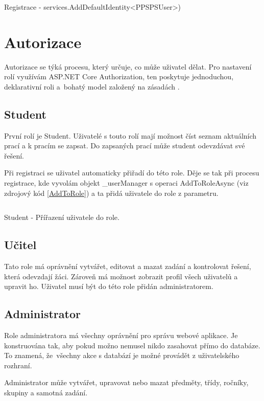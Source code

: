 \documentclass[a4paper, 12pt]{report}
\begin{document}
	\begin{listing}[H]
	\inputminted{csharp}{SourceCode/AddDefaultIdentity.cs}
	\caption{Registrace - services.AddDefaultIdentity<PPSPSUser>)}
	\label{AddDefaultIdentity}
	\end{listing}

	\chapter{Autorizace} \label{Autorizace}
	Autorizace se týká procesu, který určuje, co může uživatel dělat. Pro nastavení rolí využívám ASP.NET Core Authorization, ten poskytuje jednoduchou, deklarativní roli a~bohatý model založený na zásadách \cite{ASP.NET_Core_Autorizace}.

	\section{Student}
	První rolí je Student. Uživatelé s touto rolí mají možnost číst seznam aktuálních prací a k pracím se zapsat. Do zapsaných prací může student odevzdávat své řešení.\par
	Při registraci se uživatel automaticky přiřadí do této role. Děje se tak při procesu registrace, kde vyvolám objekt \_userManager s operaci AddToRoleAsync (viz zdrojový kód \ref{AddToRole}) a ta přidá uživatele do role z parametru.

	\begin{listing}[H]
		\inputminted{csharp}{SourceCode/AddToRole.cs}
		\caption{Student - Přířazení uživatele do role.}
		\label{AddToRole}
	\end{listing}

	\section{Učitel}
	Tato role má oprávnění vytvářet, editovat a mazat zadání a kontrolovat řešení, která odevzdají žáci. Zároveň má možnost zobrazit profil všech uživatelů a upravit ho. Uživatel musí být do této role přidán administratorem.
	\section{Administrator}
	Role administratora má všechny oprávnění pro správu webové aplikace. Je konstruována tak, aby pokud možno nemusel nikdo zasahovat přímo do databáze. To znamená, že~všechny akce s databází je možné provádět z uživatelského rozhraní.\par
	Administrator může vytvářet, upravovat nebo mazat předměty, třídy, ročníky, skupiny a samotná zadání.
\end{document}
